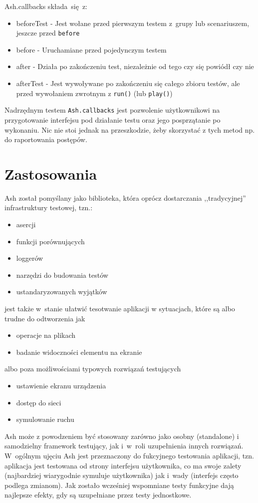 \documentclass[brudnopis]{xmgr}
\begin{document}
Ash.callbacks składa~się~z:

\begin{itemize}
  \item beforeTest - Jest wołane przed pierwszym testem z~grupy lub scenariuszem, jeszcze przed \texttt{before}
  \item before - Uruchamiane przed pojedynczym testem
  \item after - Działa po zakończeniu test, niezależnie od tego czy się powiódł czy nie
  \item afterTest - Jest wywoływane po zakończeniu się całego zbioru testów, ale przed wywołaniem zwrotnym z \texttt{run()} (lub \texttt{play()}) 
\end{itemize}

Nadrzędnym testem \texttt{Ash.callbacks} jest pozwolenie użytkownikowi na przygotowanie interfejsu pod działanie testu oraz jego posprzątanie po wykonaniu. Nic nie stoi jednak na przeszkodzie, żeby skorzystać z tych metod np. do raportowania postępów.

\chapter{Zastosowania}
Ash został pomyślany jako biblioteka, która oprócz dostarczania ,,tradycyjnej'' infrastruktury testowej, tzn.:
\begin{itemize}
  \item asercji
  \item funkcji porównujących
  \item loggerów
  \item narzędzi do budowania testów
  \item ustandaryzowanych wyjątków
\end{itemize}
jest także w~stanie ułatwić tesotwanie aplikacji w sytuacjach, które są albo trudne do odtworzenia jak
\begin{itemize}
  \item operacje na plikach
  \item badanie widoczności elementu na ekranie
\end{itemize}
 albo poza możliwościami typowych rozwiązań testujących
\begin{itemize}
  \item ustawienie ekranu urządzenia
  \item dostęp do sieci
  \item symulowanie ruchu
\end{itemize}

Ash może z powodzeniem być stosowany zarówno jako osobny (standalone) i samodzielny framework testujący, jak i~w~roli uzupełnienia innych rozwiązań. W~ogólnym ujęciu Ash jest przeznaczony do fukcyjnego testowania aplikacji, tzn. aplikacja jest testowana od strony interfejsu użytkownika, co ma swoje zalety (najbardziej wiarygodnie symuluje użytkownika) jak i~wady (interfejs często podlega zmianom). Jak zostało wcześniej wspomniane testy funkcyjne dają najlepsze efekty, gdy są uzupełniane przez testy jednostkowe.  
\end{document}
